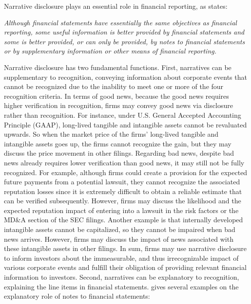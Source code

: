\documentclass[letterpaper,11pt]{article}
\begin{document}
\begin{spacing}{1.5}
Narrative disclosure plays an essential role in financial reporting, as  states:
\begin{adjustwidth}{1cm}{1cm}
\begin{singlespace}
	\textit{Although financial statements have essentially the same objectives as financial reporting, some useful information is better provided by financial statements and some is better provided, or can only be provided, by notes to financial statements or by supplementary information or other means of financial reporting.}
\end{singlespace}
\end{adjustwidth}
Narrative disclosure has two fundamental functions. First, narratives can be supplementary to recognition, conveying information about corporate events that cannot be recognized due to the inability to meet one or more of the four recognition criteria. In terms of good news, because the good news requires higher verification in recognition, firms may convey good news via disclosure rather than recognition. For instance, under U.S. General Accepted Accounting Principle (GAAP), long-lived tangible and intangible assets cannot be revaluated upwards. So when the market price of the firms' long-lived tangible and intangible assets goes up, the firms cannot recognize the gain, but they may discuss the price movement in other filings. Regarding bad news, despite bad news already requires lower verification than good news, it may still not be fully recognized. For example, although firms could create a provision for the expected future payments from a potential lawsuit, they cannot recognize the associated reputation losses since it is extremely difficult to obtain a reliable estimate that can be verified subsequently. However, firms may discuss the likelihood and the expected reputation impact of entering into a lawsuit in the risk factors or the MD\&A section of the SEC filings. Another example is that internally developed intangible assets cannot be capitalized, so they cannot be impaired when bad news arrives. However, firms may discuss the impact of news associated with these intangible assets in other filings. In sum, firms may use narrative disclosure to inform investors about the immeasurable, and thus irrecognizable impact of various corporate events and fulfill their obligation of providing relevant financial information to investors. Second, narratives can be explanatory to recognition, explaining the line items in financial statements.  gives several examples on the explanatory role of notes to financial statements:


\end{spacing}
\end{document}
